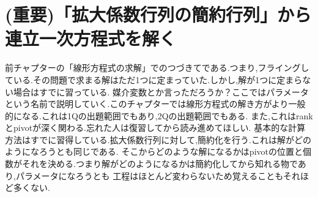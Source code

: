\section{(重要)「拡大係数行列の簡約行列」から連立一次方程式を解く}
前チャプターの「線形方程式の求解」でのつづきてである.つまり,フライングしている.その問題で求まる解はただ1つに定まっていた.しかし,解が1つに定まらない場合はすでに習っている.
媒介変数とか言っただろうか？ここではパラメータという名前で説明していく.このチャプターでは線形方程式の解き方がより一般的になる.これは1Qの出題範囲でもあり,2Qの出題範囲でもある.
また,これはrankとpivotが深く関わる.忘れた人は復習してから読み進めてほしい.
基本的な計算方法はすでに習得している.拡大係数行列に対して,簡約化を行う.これは解がどのようになろうとも同じである.
そこからどのような解になるかはpivotの位置と個数がそれを決める.つまり解がどのようになるかは簡約化してから知れる物であり,パラメータになろうとも
工程はほとんど変わらないため覚えることもそれほど多くない.

